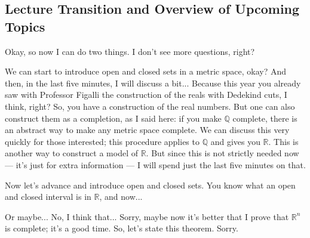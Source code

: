 \begin{content}
\end{content}

\subsection{Lecture Transition and Overview of Upcoming Topics}

\begin{speech}[01:00:57 - 01:02:42]
 Okay, so now I can do two things. I don't see more questions, right?

We can start to introduce open and closed sets in a metric space, okay? And then, in the last five minutes, I will discuss a bit... Because this year you already saw with Professor Figalli the construction of the reals with Dedekind cuts, I think, right? So, you have a construction of the real numbers. But one can also construct them as a completion, as I said here: if you make $\mathbb{Q}$ complete, there is an abstract way to make any metric space complete. We can discuss this very quickly for those interested; this procedure applies to $\mathbb{Q}$ and gives you $\mathbb{R}$. This is another way to construct a model of $\mathbb{R}$. But since this is not strictly needed now --- it's just for extra information --- I will spend just the last five minutes on that.

Now let's advance and introduce open and closed sets. You know what an open and closed interval is in $\mathbb{R}$, and now... 

Or maybe... No, I think that... Sorry, maybe now it's better that I prove that $\mathbb{R}^n$ is complete; it's a good time. So, let's state this theorem. Sorry.
\end{speech}

\begin{hidden}
\end{hidden}

